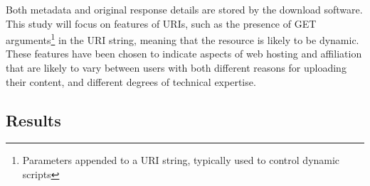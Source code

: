 Both metadata and original response details are stored by the download software.  This study will focus on features of URIs, such as the presence of GET arguments\footnote{Parameters appended to a URI string, typically used to control dynamic scripts}
in the URI string, meaning that the resource is likely to be dynamic.  These features have been chosen to indicate aspects of web hosting and affiliation that are likely to vary between users with both different reasons for uploading their content, and different degrees of technical expertise.














\subsection{Results}





